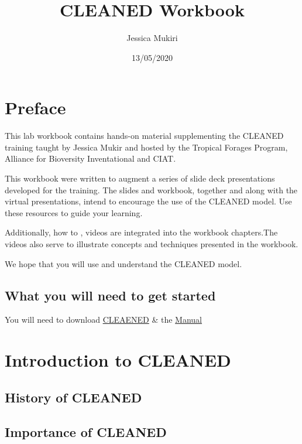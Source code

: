\documentclass[
]{book}
\title{CLEANED Workbook}
\author{Jessica Mukiri}
\date{13/05/2020}
\begin{document}
\maketitle

{
\setcounter{tocdepth}{1}
\tableofcontents
}
\hypertarget{preface}{%
\chapter*{Preface}\label{preface}}

This lab workbook contains hands-on material supplementing the CLEANED training taught by Jessica Mukir and hosted by the Tropical Forages Program, Alliance for Bioversity Inventational and CIAT.

This workbook were written to augment a series of slide deck presentations developed for the training. The slides and workbook, together and along with the virtual presentations, intend to encourage the use of the CLEANED model. Use these resources to guide your learning.

Additionally, how to , videos are integrated into the workbook chapters.The videos also serve to illustrate concepts and techniques presented in the workbook.

We hope that you will use and understand the CLEANED model.

\hypertarget{what-you-will-need-to-get-started}{%
\section*{What you will need to get started}\label{what-you-will-need-to-get-started}}

You will need to download \href{https://dataverse.harvard.edu/dataset.xhtml?persistentId=doi:10.7910/DVN/G0G8IY}{CLEAENED} \& the \href{https://hdl.handle.net/10568/107238}{Manual}

\hypertarget{intro}{%
\chapter{Introduction to CLEANED}\label{intro}}

\hypertarget{history-of-cleaned}{%
\section{History of CLEANED}\label{history-of-cleaned}}

\hypertarget{importance-of-cleaned}{%
\section{Importance of CLEANED}\label{importance-of-cleaned}}
\end{document}

